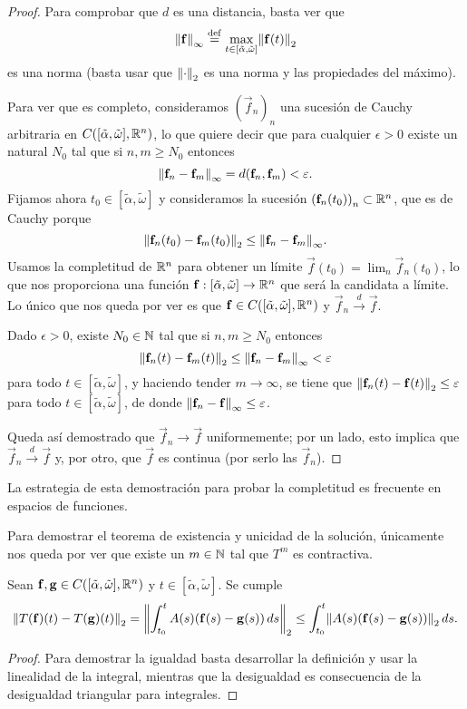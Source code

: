 \documentclass[../ecuaciones_diferenciales.tex]{subfiles}
\begin{document}
\begin{proof}
	Para comprobar que \(d\) es una distancia, basta ver que
	\[\norm{\vec{f}}_\infty
		\eqdef \max_{t \in [\tilde{\alpha}, \tilde{\omega}]}
			\norm{\vec{f}(t)}_2\]
	es una norma (basta usar que \(\norm{\cdot}_2\) es una norma y las
	propiedades del máximo).

	Para ver que es completo, consideramos \({(\vec{f}_n)}_n\) una sucesión de
	Cauchy arbitraria en \(C([\tilde{\alpha}, \tilde{\omega}], \mathbb{R}^n)\),
	lo que quiere decir que para cualquier \(\epsilon > 0\) existe un
	natural \(N_0\) tal que si \(n, m \geq N_0\) entonces
	\[\norm{\vec{f}_n - \vec{f}_m}_\infty
		= d(\vec{f}_n, \vec{f}_m) < \epsilon.\]
	Fijamos ahora \(t_0 \in [\tilde{\alpha}, \tilde{\omega}]\) y consideramos la
	sucesión \({(\mathbf{f}_n(t_0))}_n \subset \mathbb{R}^n\), que es de Cauchy porque
	\[\norm{\vec{f}_n(t_0) - \vec{f}_m(t_0)}_2
		\leq \norm{\vec{f}_n - \vec{f}_m}_\infty.\]
	Usamos la completitud de \(\mathbb{R}^n\) para obtener un límite
	\(\vec{f}(t_0) = \lim_n \vec{f}_n(t_0)\), lo
	que nos proporciona una función
	\(\mathbf{f}: [\tilde{\alpha}, \tilde{\omega}] \to \mathbb{R}^n\) que será la candidata
	a límite. Lo único que nos queda por ver es que
	\(\mathbf{f} \in C([\tilde{\alpha}, \tilde{\omega}], \mathbb{R}^n)\) y
	\(\vec{f}_n \overset{d}{\to} \vec{f}\).

	Dado \(\epsilon > 0\), existe \(N_0 \in \mathbb{N}\) tal que si \(n, m \geq N_0\)
	entonces
	\[\norm{\vec{f}_n(t) - \vec{f}_m(t)}_2
		\leq \norm{\vec{f}_n - \vec{f}_m}_\infty < \epsilon\]
	para todo \(t \in [\tilde{\alpha}, \tilde{\omega}]\), y haciendo tender
	\(m \to \infty\), se tiene que
	\(\norm{\vec{f}_n(t) - \vec{f}(t)}_2 \leq \epsilon\) para todo
	\(t \in [\tilde{\alpha}, \tilde{\omega}]\), de donde
	\(\norm{\vec{f}_n - \vec{f}}_\infty \leq \epsilon\).

	Queda así demostrado que \(\vec{f}_n \to \vec{f}\) uniformemente;
	por un lado, esto implica que \(\vec{f}_n \overset{d}{\to} \vec{f}\) y,
	por otro, que \(\vec{f}\) es continua (por serlo las \(\vec{f}_n\)).
\end{proof}

\begin{remark}
	La estrategia de esta demostración para probar la completitud es frecuente en
	espacios de funciones.
\end{remark}

Para demostrar el teorema de existencia y unicidad de la solución, únicamente
nos queda por ver que existe un \(m \in \mathbb{N}\) tal que \(T^m\) es contractiva.

\begin{lemma}\label{prop:operator_int_ineq}
	Sean \(\mathbf{f}, \mathbf{g} \in C([\tilde{\alpha}, \tilde{\omega}], \mathbb{R}^n)\) y
	\(t \in [\tilde{\alpha}, \tilde{\omega}]\). Se cumple
	\[\norm{T(\vec{f})(t) - T(\vec{g})(t)}_2
		= \norm{\int_{t_0}^t A(s)(\vec{f}(s) - \vec{g}(s)) \dif s}_2
		\leq \int_{t_0}^t \norm{A(s)(\vec{f}(s) - \vec{g}(s))}_2 \dif s.\]
\end{lemma}
\begin{proof}
    Para demostrar la igualdad basta desarrollar la definición y usar la
    linealidad de la integral, mientras que la desigualdad es consecuencia
    de la desigualdad triangular para integrales.
\end{proof}
\end{document}
